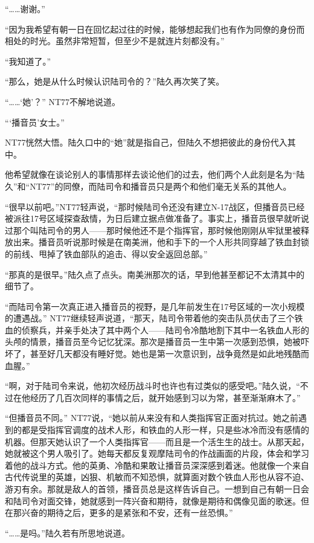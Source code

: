 “……谢谢。”

“因为我希望有朝一日在回忆起过往的时候，能够想起我们也有作为同僚的身份而相处的时光。虽然非常短暂，但至少不是就连片刻都没有。”

“我知道了。”

“那么，她是从什么时候认识陆司令的？”陆久再次笑了笑。

“……‘她’？” NT77不解地说道。

“‘播音员’女士。”

NT77恍然大悟。陆久口中的“她”就是指自己，但陆久不想把彼此的身份代入其中。

他希望就像在谈论别人的事情那样去谈论他们的过去，他们两个人此刻是名为“陆久”和“NT77”的同僚，而陆司令和播音员只是两个和他们毫无关系的其他人。

“很早以前吧。”NT77轻声说，“那时候陆司令还没有建立N-17战区，但播音员已经被派往17号区域探查敌情，为日后建立据点做准备了。事实上，播音员很早就听说过那个叫陆司令的男人——那时候他还不是个指挥官，那时候他刚刚从牢狱里被释放出来。播音员听说那时候是在南美洲，他和手下的一个人形共同穿越了铁血封锁的前线、甩掉了铁血部队的追击、得以安全返回总部。”

“那真的是很早。”陆久点了点头。南美洲那次的话，早到他甚至都记不太清其中的细节了。

“而陆司令第一次真正进入播音员的视野，是几年前发生在17号区域的一次小规模的遭遇战。” NT77继续轻声说道，“那天，陆司令带着他的突击队员伏击了三个铁血的侦察兵，并亲手处决了其中两个人——陆司令冷酷地割下其中一名铁血人形的头颅的情景，播音员至今记忆犹深。那次是播音员一生中第一次感到恐惧，她被吓坏了，甚至好几天都没有睡好觉。她也是第一次意识到，战争竟然是如此地残酷而血腥。”

“啊，对于陆司令来说，他初次经历战斗时也许也有过类似的感受吧。”陆久说，“不过在他经历了几百次同样的事情之后，就开始感到习以为常，甚至渐渐麻木了。”

“但播音员不同。” NT77说，“她以前从来没有和人类指挥官正面对抗过。她之前遇到的都是受指挥官调度的战术人形，和铁血的人形一样，只是些冰冷而没有感情的机器。但那天她认识了一个人类指挥官——而且是一个活生生的战士。从那天起，她就被这个男人吸引了。她每天都反复观摩陆司令的作战画面的片段，体会和学习着他的战斗方式。他的英勇、冷酷和果敢让播音员深深感到着迷。他就像一个来自古代传说里的英雄，凶狠、机敏而不知恐惧，就算面对数个铁血人形也从容不迫、游刃有余。那就是敌人的首领，播音员总是这样告诉自己。一想到自己有朝一日会和陆司令对面交锋，她就感到一阵兴奋和期待，就像是期待和偶像见面的歌迷。但在那兴奋的期待之后，更多的是紧张和不安，还有一丝恐惧。”

“……是吗。”陆久若有所思地说道。

